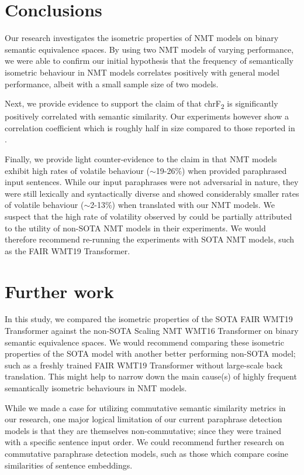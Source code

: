 \documentclass[11pt,a4paper]{article}
\begin{document}
\section{Conclusions}

Our research investigates the isometric properties of NMT models on binary semantic equivalence spaces. By using two NMT models of varying performance, we were able to confirm our initial hypothesis that the frequency of semantically isometric behaviour in NMT models correlates positively with general model performance, albeit with a small sample size of two models. 

Next, we provide evidence to support the claim of \citet{michel2019evaluation} that chrF\textsubscript{2} is significantly positively correlated with semantic similarity. Our experiments however show a correlation coefficient which is roughly half in size compared to those reported in \citet{michel2019evaluation}.

Finally, we provide light counter-evidence to the claim in \citet{fadaee2020unreasonable} that NMT models exhibit high rates of volatile behaviour ($\sim$19-26$\%$) when provided paraphrased input sentences. While our input paraphrases were not adversarial in nature, they were still lexically and syntactically diverse and showed considerably smaller rates of volatile behaviour ($\sim$2-13$\%$) when translated with our NMT models. We suspect that the high rate of volatility observed by \citet{fadaee2020unreasonable} could be partially attributed to the utility of non-SOTA NMT models in their experiments. We would therefore recommend re-running the experiments with SOTA NMT models, such as the FAIR WMT19 Transformer. 

\section{Further work}

In this study, we compared the isometric properties of the SOTA FAIR WMT19 Transformer against the non-SOTA Scaling NMT WMT16 Transformer on binary semantic equivalence spaces. We would recommend comparing these isometric properties of the SOTA model with another better performing non-SOTA model; such as a freshly trained FAIR WMT19 Transformer without large-scale back translation. This might help to narrow down the main cause(s) of highly frequent semantically isometric behaviours in NMT models.

While we made a case for utilizing commutative semantic similarity metrics in our research, one major logical limitation of our current paraphrase detection models is that they are themselves non-commutative; since they were trained with a specific sentence input order. We could recommend further research on commutative paraphrase detection models, such as those which compare cosine similarities of sentence embeddings.
\end{document}
